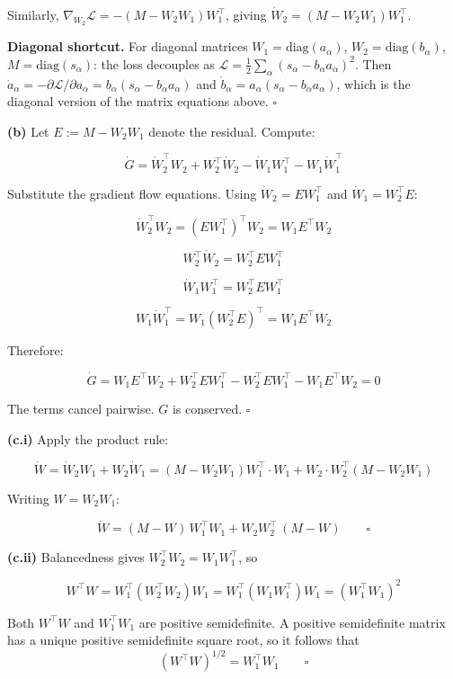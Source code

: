 \documentclass[
]{article}
\begin{document}
Similarly, \(\nabla_{W_2}\mathcal{L} = -(M - W_2 W_1)W_1^\top\), giving
\(\dot{W}_2 = (M - W_2 W_1)W_1^\top\).

\textbf{Diagonal shortcut.} For diagonal matrices
\(W_1 = \text{diag}(a_\alpha)\), \(W_2 = \text{diag}(b_\alpha)\),
\(M = \text{diag}(s_\alpha)\): the loss decouples as
\(\mathcal{L} = \frac{1}{2}\sum_\alpha(s_\alpha - b_\alpha a_\alpha)^2\).
Then
\(\dot{a}_\alpha = -\partial\mathcal{L}/\partial a_\alpha = b_\alpha(s_\alpha - b_\alpha a_\alpha)\)
and \(\dot{b}_\alpha = a_\alpha(s_\alpha - b_\alpha a_\alpha)\), which
is the diagonal version of the matrix equations above. \(\square\)

\textbf{(b)} Let \(E := M - W_2 W_1\) denote the residual. Compute:

\[\dot{G} = \dot{W}_2^\top W_2 + W_2^\top \dot{W}_2 - \dot{W}_1 W_1^\top - W_1 \dot{W}_1^\top\]

Substitute the gradient flow equations. Using \(\dot{W}_2 = E W_1^\top\)
and \(\dot{W}_1 = W_2^\top E\):

\[\dot{W}_2^\top W_2 = (E W_1^\top)^\top W_2 = W_1 E^\top W_2\]

\[W_2^\top \dot{W}_2 = W_2^\top E W_1^\top\]

\[\dot{W}_1 W_1^\top = W_2^\top E W_1^\top\]

\[W_1 \dot{W}_1^\top = W_1(W_2^\top E)^\top = W_1 E^\top W_2\]

Therefore:

\[\dot{G} = W_1 E^\top W_2 + W_2^\top E W_1^\top - W_2^\top E W_1^\top - W_1 E^\top W_2 = 0\]

The terms cancel pairwise. \(G\) is conserved. \(\square\)

\textbf{(c.i)} Apply the product rule:

\[\dot{W} = \dot{W}_2 W_1 + W_2 \dot{W}_1 = (M - W_2 W_1)W_1^\top \cdot W_1 + W_2 \cdot W_2^\top(M - W_2 W_1)\]

Writing \(W = W_2 W_1\):

\[\dot{W} = (M - W)\,W_1^\top W_1 + W_2 W_2^\top\,(M - W) \qquad \square\]

\textbf{(c.ii)} Balancedness gives \(W_2^\top W_2 = W_1 W_1^\top\), so

\[W^\top W = W_1^\top \left(W_2^\top W_2\right) W_1 = W_1^\top \left(W_1 W_1^\top\right) W_1 = \left(W_1^\top W_1\right)^2\]

Both \(W^\top W\) and \(W_1^\top W_1\) are positive semidefinite.
A positive semidefinite matrix has a unique positive semidefinite square root, so it follows that
\[(W^\top W)^{1/2} = W_1^\top W_1 \qquad \square\]
\end{document}
